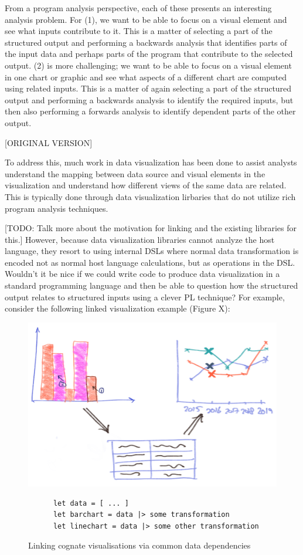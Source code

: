 From a program analysis perspective, each of these presents an interesting analysis problem. For (1), we want to be able to focus on a visual element and see what inputs contribute to it. This is a matter of selecting a part of the structured output and performing a backwards analysis that identifies parts of the input data and perhaps parts of the program that contribute to the selected output. (2) is more challenging; we want to be able to focus on a visual element in one chart or graphic and see what aspects of a different chart are computed using related inputs. This is a matter of again selecting a part of the structured output and performing a backwards analysis to identify the required inputs, but then also performing a forwards analysis to identify dependent parts of the other output.

[ORIGINAL VERSION]

To address this, much work in data visualization has been done to assist analysts understand the mapping between data source and visual elements in the visualization and understand how different views of the same data are related. This is typically done through data visualization lirbaries that do not utilize rich program analysis techniques.

[TODO: Talk more about the motivation for linking and the existing libraries for this.]
However, because data visualization libraries cannot analyze the host language, they resort to using internal DSLs where normal data transformation is encoded not as normal host language calculations, but as operations in the DSL. Wouldn't it be nice if we could write code to produce data visualization in a standard programming language and then be able to question how the structured output relates to structured inputs using a clever PL technique? For example, consider the following linked visualization example (Figure X):

\begin{figure}[H]
   {\includegraphics[scale=0.14]{fig/example/vis-linking.png}}
   \small
   \begin{lstlisting}
      let data = [ ... ]
      let barchart = data |> some transformation
      let linechart = data |> some other transformation
   \end{lstlisting}
   \caption{Linking cognate visualisations via common data dependencies}
   \label{fig:introduction:vis-linking}
\end{figure}


